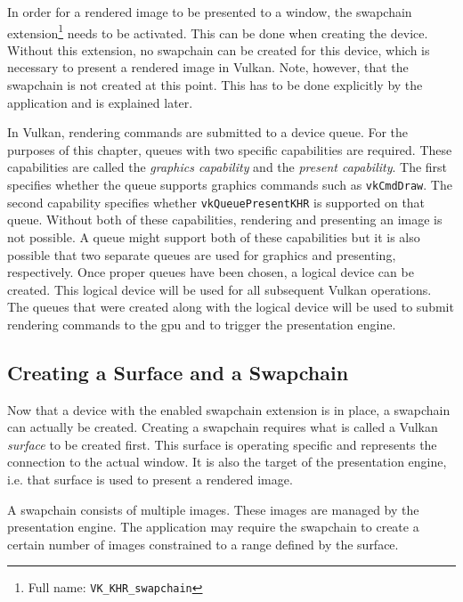       In order for a rendered image to be presented to a window, the swapchain extension\footnote{Full name: \lstinline{VK_KHR_swapchain}} needs to be activated.
      This can be done when creating the device.
      Without this extension, no swapchain can be created for this device, which is necessary to present a rendered image in Vulkan.
      Note, however, that the swapchain is not created at this point.
      This has to be done explicitly by the application and is explained later.

      In Vulkan, rendering commands are submitted to a device queue.
      For the purposes of this chapter, queues with two specific capabilities are required.
      These capabilities are called the \textit{graphics capability} and the \textit{present capability}.
      The first specifies whether the queue supports graphics commands such as \lstinline{vkCmdDraw}.
      The second capability specifies whether \lstinline{vkQueuePresentKHR} is supported on that queue.
      Without both of these capabilities, rendering and presenting an image is not possible.
      A queue might support both of these capabilities but it is also possible that two separate queues are used for graphics and presenting, respectively.
      Once proper queues have been chosen, a logical device can be created.
      This logical device will be used for all subsequent Vulkan operations.
      The queues that were created along with the logical device will be used to submit rendering commands to the \gls{gpu} and to trigger the presentation engine.

    \subsection{Creating a Surface and a Swapchain}
      Now that a device with the enabled swapchain extension is in place, a swapchain can actually be created.
      Creating a swapchain requires what is called a Vulkan \textit{surface} to be created first.
      This surface is operating specific and represents the connection to the actual window.
      It is also the target of the presentation engine, i.e. that surface is used to present a rendered image.

      A swapchain consists of multiple images.
      These images are managed by the presentation engine.
      The application may require the swapchain to create a certain number of images constrained to a range defined by the surface.

